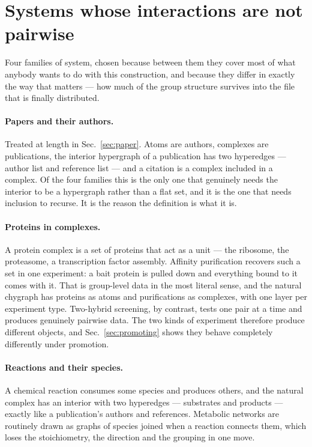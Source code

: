 \section{Systems whose interactions are not pairwise}
\label{sec:systems}

Four families of system, chosen because between them they cover most of what
anybody wants to do with this construction, and because they differ in exactly
the way that matters --- how much of the group structure survives into the file
that is finally distributed.

\paragraph{Papers and their authors.} Treated at length in
Sec.~\ref{sec:paper}. Atoms are authors, complexes are publications, the
interior hypergraph of a publication has two hyperedges --- author list and
reference list --- and a citation is a complex included in a complex. Of the
four families this is the only one that genuinely needs the interior to be a
hypergraph rather than a flat set, and it is the one that needs inclusion to
recurse. It is the reason the definition is what it is.

\paragraph{Proteins in complexes.} A protein complex is a set of proteins that
act as a unit --- the ribosome, the proteasome, a transcription factor assembly.
Affinity purification recovers such a set in one experiment: a bait protein is
pulled down and everything bound to it comes with it. That is group-level data
in the most literal sense, and the natural chygraph has proteins as atoms and
purifications as complexes, with one layer per experiment type. Two-hybrid
screening, by contrast, tests one pair at a time and produces genuinely pairwise
data. The two kinds of experiment therefore produce different objects, and
Sec.~\ref{sec:promoting} shows they behave completely differently under
promotion.

\paragraph{Reactions and their species.} A chemical reaction consumes some
species and produces others, and the natural complex has an interior with two
hyperedges --- substrates and products --- exactly like a publication's authors
and references. Metabolic networks are routinely drawn as graphs of species
joined when a reaction connects them, which loses the stoichiometry, the
direction and the grouping in one move.

